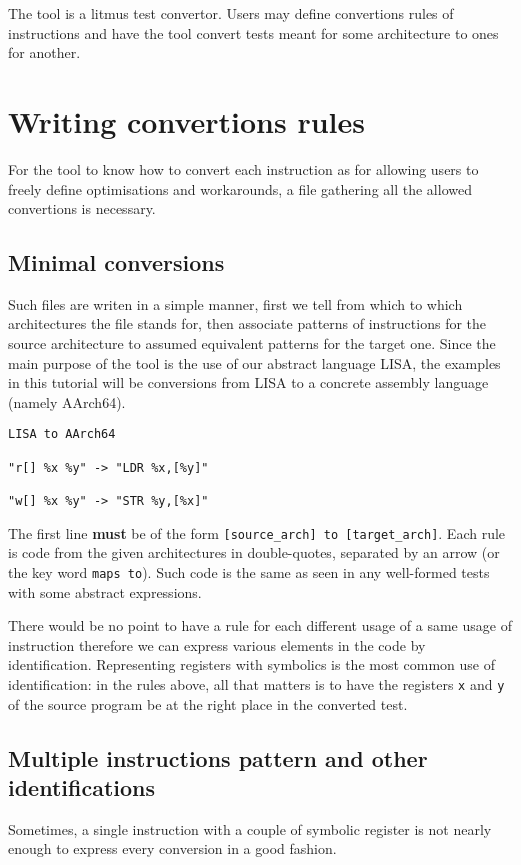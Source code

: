 
The tool \jingle{} is a litmus test convertor.
Users may define convertions rules of instructions and have the tool convert
tests meant for some architecture to ones for another.

\section{Writing convertions rules}
For the tool to know how to convert each instruction as for allowing users to
freely define optimisations and workarounds, a file gathering all the allowed
convertions is necessary.

\subsection{Minimal conversions}
Such files are writen in a simple manner, first we tell from which to which
architectures the file stands for, then associate patterns of instructions
for the source architecture to assumed equivalent patterns
for the target one.\newline
Since the main purpose of the tool is the use of our abstract language LISA,
the examples in this tutorial will be conversions from LISA to a concrete
assembly language (namely AArch64).

\begin{verbatim}
LISA to AArch64

"r[] %x %y" -> "LDR %x,[%y]"

"w[] %x %y" -> "STR %y,[%x]"
\end{verbatim}

The first line \textbf{must} be of the form
\verb+[source_arch] to [target_arch]+.\newline
Each rule is code from the given architectures in double-quotes,
separated by an arrow (or the key word \verb+maps to+).
Such code is the same as seen in any well-formed tests with some
abstract expressions.

There would be no point to have a rule for each different usage of a same
usage of instruction therefore we can express various elements in the code
by identification.
Representing registers with symbolics is the most common use of identification:
in the rules above, all that matters is to have the registers \verb+x+
and \verb+y+ of the source program be at the right place in the converted test.

\subsection{Multiple instructions pattern and other identifications}
Sometimes, a single instruction with a couple of symbolic register
is not nearly enough to express every conversion in a good fashion.

